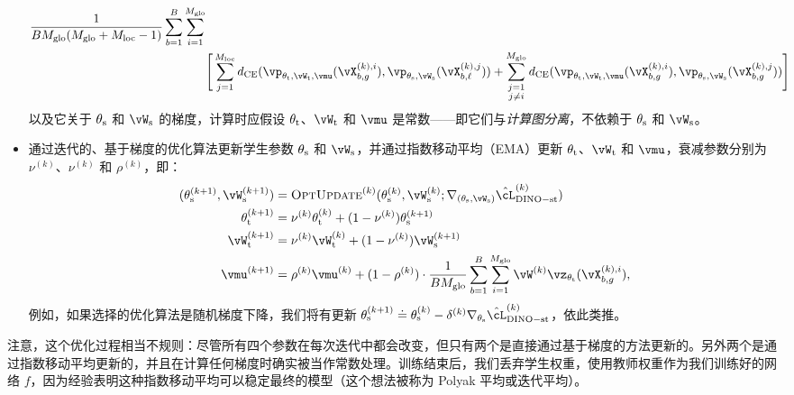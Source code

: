 \documentclass[../../book-main_zh.tex]{subfiles}
\begin{document}
\begin{itemize}
\begin{align}
        \frac{1}{BM_{\glo}(M_{\glo} + M_{\loc} - 1)}\sum_{b = 1}^{B}\sum_{i = 1}^{M_{\glo}}\\
        &\Bigg[\sum_{j = 1}^{M_{\loc}}d_{\CE}(\vp_{\theta_{\teacher}, \vW_{\teacher}, \vmu}(\vX_{b, g}^{(k), i}), \vp_{\theta_{\student}, \vW_{\student}}(\vX_{b, \ell}^{(k), j})) + \sum_{\substack{j = 1 \\ j \neq i}}^{M_{\glo}}d_{\CE}(\vp_{\theta_{\teacher}, \vW_{\teacher}, \vmu}(\vX_{b, g}^{(k), i}), \vp_{\theta_{\student}, \vW_{\student}}(\vX_{b, g}^{(k), j}))\Bigg]\nonumber
    \end{align}
    以及它关于 \(\theta_{\mathrm{s}}\) 和 \(\vW_{\student}\) 的梯度，计算时应假设 \(\theta_{\mathrm{t}}\)、\(\vW_{\teacher}\) 和 \(\vmu\) 是常数——即它们与\textit{计算图分离}，不依赖于 \(\theta_{\mathrm{s}}\) 和 \(\vW_{\student}\)。
    \item 通过迭代的、基于梯度的优化算法更新学生参数 \(\theta_{\mathrm{s}}\) 和 \(\vW_{\student}\)，并通过指数移动平均（EMA）更新 \(\theta_{\mathrm{t}}\)、\(\vW_{\teacher}\) 和 \(\vmu\)，衰减参数分别为 \(\nu^{(k)}\)、\(\nu^{(k)}\) 和 \(\rho^{(k)}\)，即：
    \begin{align}
        (\theta_{\student}^{(k + 1)}, \vW_{\student}^{(k + 1)})
        &= \textsc{OptUpdate}^{(k)}(\theta_{\student}^{(k)}, \vW_{\student}^{(k)}; \nabla_{(\theta_{\student}, \vW_{\student})}\hat{\cL}_{\dino-\student\teacher}^{(k)}) \\
        \theta_{\teacher}^{(k + 1)}
        &= \nu^{(k)}\theta_{\teacher}^{(k)} + (1 - \nu^{(k)})\theta_{\student}^{(k + 1)} \\
        \vW_{\teacher}^{(k + 1)}
        &= \nu^{(k)}\vW_{\teacher}^{(k)} + (1 - \nu^{(k)})\vW_{\student}^{(k + 1)} \\
        \vmu^{(k + 1)}
        &= \rho^{(k)}\vmu^{(k)} + (1 - \rho^{(k)})\cdot\frac{1}{BM_{\glo}}\sum_{b = 1}^{B}\sum_{i = 1}^{M_{\glo}}\vW^{(k)}\vz_{\theta_{\teacher}}(\vX_{b, g}^{(k), i}),
    \end{align}
    例如，如果选择的优化算法是随机梯度下降，我们将有更新 \(\theta_{\student}^{(k + 1)} \doteq \theta_{\student}^{(k)} - \delta^{(k)}\nabla_{\theta_{\student}}\hat{\cL}_{\dino{}-\student\teacher}^{(k)}\)，依此类推。
\end{itemize}
注意，这个优化过程相当不规则：尽管所有四个参数在每次迭代中都会改变，但只有两个是直接通过基于梯度的方法更新的。另外两个是通过指数移动平均更新的，并且在计算任何梯度时确实被当作常数处理。训练结束后，我们丢弃学生权重，使用教师权重作为我们训练好的网络 \(f\)，因为经验表明这种指数移动平均可以稳定最终的模型（这个想法被称为 Polyak 平均或迭代平均）。
\end{document}
